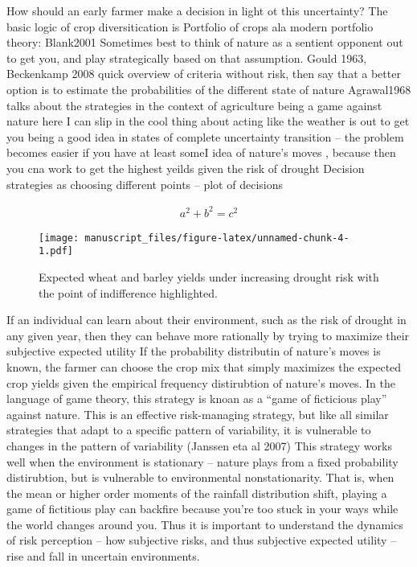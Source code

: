 \documentclass[smallextended]{svjour3}       %
\begin{document}
How should an early farmer make a decision in light ot this uncertainty?
The basic logic of crop diversitication is Portfolio of crops ala modern
portfolio theory: Blank2001 Sometimes best to think of nature as a
sentient opponent out to get you, and play strategically based on that
assumption. Gould 1963, Beckenkamp 2008 quick overview of criteria
without risk, then say that a better option is to estimate the
probabilities of the different state of nature Agrawal1968 talks about
the strategies in the context of agriculture being a game against nature
here I can slip in the cool thing about acting like the weather is out
to get you being a good idea in states of complete uncertainty
transition -- the problem becomes easier if you have at least someI idea
of nature's moves , because then you cna work to get the highest yeilds
given the risk of drought Decision strategies as choosing different
points -- plot of decisions

\begin{align}
a^2+b^2=c^2
\end{align}

\begin{figure}
\centering
\texttt{[image: manuscript\_files/figure-latex/unnamed-chunk-4-1.pdf]}
\caption{Expected wheat and barley yields under increasing drought risk
with the point of indifference highlighted.}
\end{figure}

If an individual can learn about their environment, such as the risk of
drought in any given year, then they can behave more rationally by
trying to maximize their subjective expected utility If the probability
distributin of nature's moves is known, the farmer can choose the crop
mix that simply maximizes the expected crop yields given the empirical
frequency distirubtion of nature's moves. In the language of game
theory, this strategy is knoan as a ``game of ficticious play'' against
nature. This is an effective risk-managing strategy, but like all
similar strategies that adapt to a specific pattern of variability, it
is vulnerable to changes in the pattern of variability (Janssen eta al
2007) This strategy works well when the environment is stationary --
nature plays from a fixed probability distirubtion, but is vulnerable to
environmental nonstationarity. That is, when the mean or higher order
moments of the rainfall distribution shift, playing a game of fictitious
play can backfire because you're too stuck in your ways while the world
changes around you. Thus it is important to understand the dynamics of
risk perception -- how subjective risks, and thus subjective expected
utility -- rise and fall in uncertain environments.
\end{document}
